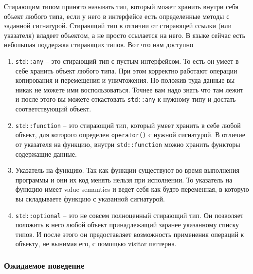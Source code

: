 Стирающим типом принято называть тип, который может хранить внутри себя объект любого типа, если у него в интерфейсе есть определенные методы с заданной сигнатурой.
Стирающий тип в отличии от стирающей ссылки (или указателя) владеет объектом, а не просто ссылается на него.
В языке сейчас есть небольшая поддержка стирающих типов.
Вот что нам доступно
\begin{enumerate}
\item \verb"std::any" -- это стирающий тип с пустым интерфейсом.
То есть он умеет в себе хранить объект любого типа.
При этом корректно работают операции копирования и перемещения и уничтожения.
Но положив туда данные вы никак не можете ими воспользоваться.
Точнее вам надо знать что там лежит и после этого вы можете откастовать \verb"std::any" к нужному типу и достать соответствующий объект.

\item \verb"std::function" -- это стирающий тип, который умеет хранить в себе любой объект, для которого определен \verb"operator()" с нужной сигнатурой.
В отличие от указателя на функцию, внутри \verb"std::function" можно хранить функторы содержащие данные.

\item Указатель на функцию.
Так как функции существуют во время выполнения программы и они их код менять нельзя при исполнении.
То указатель на функцию имеет value semantics и ведет себя как будто переменная, в которую вы складываете функцию с указанной сигнатурой.

\item \verb"std::optional" -- это не совсем полноценный стирающий тип.
Он позволяет положить в него любой объект принадлежащий заранее указанному списку типов.
И после этого он предоставляет возможность применения операций к объекту, не вынимая его, с помощью visitor паттерна.
\end{enumerate}

\subsubsection{Ожидаемое поведение}

